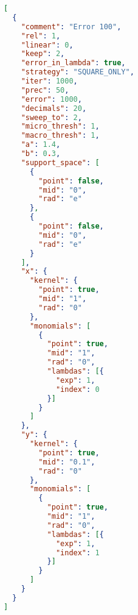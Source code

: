 \begin{lstlisting}[language=JSON, caption=Bespielkonfiguration,captionpos=b, label=list:config]
 [
  {
    "comment": "Error 100",
    "rel": 1,
    "linear": 0,
    "keep": 2,
    "error_in_lambda": true,
    "strategy": "SQUARE_ONLY",
    "iter": 1000,
    "prec": 50,
    "error": 1000,
    "decimals": 20,
    "sweep_to": 2,
    "micro_thresh": 1,
    "macro_thresh": 1,
    "a": 1.4,
    "b": 0.3,
    "support_space": [
      {
        "point": false,
        "mid": "0",
        "rad": "e"
      },
      {
        "point": false,
        "mid": "0",
        "rad": "e"
      }
    ],
    "x": {
      "kernel": {
        "point": true,
        "mid": "1",
        "rad": "0"
      },
      "monomials": [
        {
          "point": true,
          "mid": "1",
          "rad": "0",
          "lambdas": [{
            "exp": 1,
            "index": 0
          }]
        }
      ]
    },
    "y": {
      "kernel": {
        "point": true,
        "mid": "0.1",
        "rad": "0"
      },
      "monomials": [
        {
          "point": true,
          "mid": "1",
          "rad": "0",
          "lambdas": [{
            "exp": 1,
            "index": 1
          }]
        }
      ]
    }
  }
]
\end{lstlisting}
